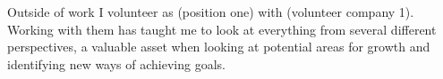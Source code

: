 Outside of work I volunteer as (position one) with (volunteer company 1). Working with them has taught me to look at everything from several different perspectives, a valuable asset when looking at potential areas for growth and identifying new ways of achieving goals.